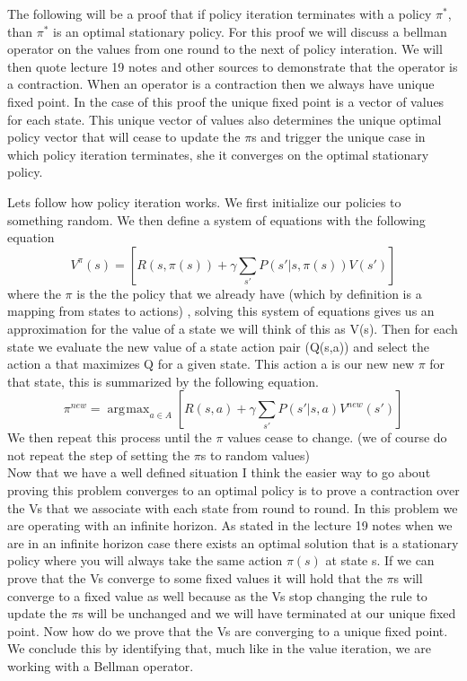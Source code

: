 \documentclass[solution, letterpaper]{cs121}
\DeclareMathOperator*{\argmax}{\arg\!\max}
\begin{document}

\subproblem{} %
The following will be a proof that if policy iteration terminates with a policy $\pi^*$, than $\pi^*$ is an optimal stationary policy. For this proof we will discuss a bellman operator on the values from one round to the next of policy interation. We will then quote lecture 19 notes and other sources to demonstrate that the operator is a contraction. When an operator is a contraction then we always have unique fixed point. In the case of this proof the unique fixed point is a vector of values for each state. This unique vector of values also determines the unique optimal policy vector that will cease to update the $\pi$s and trigger the unique case in which policy iteration terminates, she it converges on the optimal stationary policy.  

Lets follow how policy iteration works. We first initialize our policies to something random. We then define a system of equations with the following equation
\[ V^{\pi}(s)  =  \left[ R(s,\pi(s) ) + \gamma \sum_{s'} P(s' | s,\pi(s))V(s')\right ]\]
where the $\pi$ is the the policy that we already have (which by definition is a mapping from states to actions) , solving this system of equations gives us an approximation for the value of a state we will think of this as V(s).
Then for each state we evaluate the new value of a state action pair (Q(s,a)) and select the action a that maximizes Q for a given state. This action a is our new new $\pi$ for that state, this is summarized by the following equation.
\[\pi^{new} = \argmax_{a \in A}  \left[ R(s,a ) + \gamma \sum_{s'} P(s' | s,a)V^{new}(s')\right ]\]
We then repeat this process until the $\pi$ values cease to change. (we of course do not repeat the step of setting the $\pi$s to random values) \\
Now that we have a well defined situation I think the easier way to go about proving this problem converges to an optimal policy is to prove a contraction over the Vs that we associate with each state from round to round.  In this problem we are operating with an infinite horizon. As stated in the lecture 19 notes when we are in an infinite horizon case there exists an optimal solution that is a stationary policy where you will always take the same action $\pi(s)$ at state s.  If we can prove that the Vs converge to some fixed values it will hold that the $\pi$s will converge to a fixed value as well because as the Vs stop changing the rule to update the $\pi$s will be unchanged and we will have terminated at our unique fixed point. Now how do we prove that the Vs are converging to a unique fixed point. We conclude this by identifying that, much like in the value iteration, we are working with a Bellman operator.\\
\end{document}
